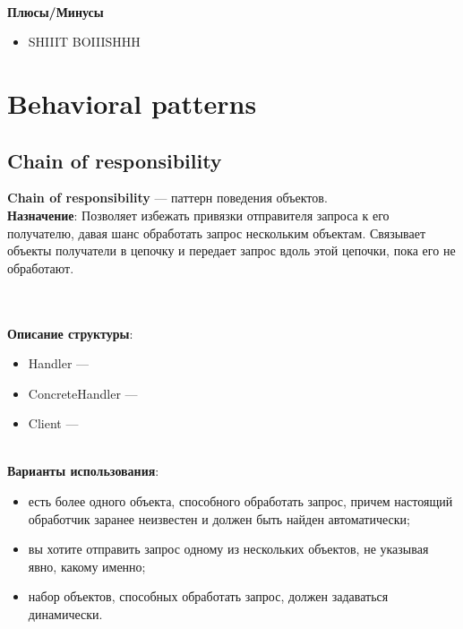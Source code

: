 \documentclass[a3paper,11pt]{report}
\def \boxSize {7cm}
\newcommand{\umlnoteND}[6]{
	\node[umlcd style, anchor=north, draw, shape=umlcdnote, text width=#2] at (#1) (note) {#3};
	\draw [umlcd style dashed line , ] (note.#4) ++(#5) --++(#6) coordinate(tmp) node[circle,inner sep=0pt,draw, fill=black!1, minimum size=5pt] (NoD) { };
}
\newcommand\tab[1][1cm]{\hspace*{#1}}
\begin{document}
\textbf{\\Плюсы/Минусы}
\begin{itemize}
\item [] SHIIIT BOIIISHHH
\end{itemize}
\newpage
\section{Behavioral patterns}
\subsection{Chain of responsibility}

\large\textbf{Chain of responsibility} --- паттерн поведения объектов.
\\
\large\textbf{Назначение}: Позволяет избежать привязки отправителя запроса к его получателю, давая шанс обработать запрос нескольким объектам. Связывает объекты получатели в цепочку и передает запрос вдоль этой цепочки, пока его не обработают.
\\

\\\\
\textbf{Описание структуры}:
\begin{itemize}
\item Handler ---
\item ConcreteHandler ---
\item Client ---
\end{itemize}

\large\textbf{\\Варианты использования}:
\begin{itemize}
\item есть более одного объекта, способного обработать запрос, причем настоящий обработчик заранее неизвестен и должен быть найден автоматически;
\item вы хотите отправить запрос одному из нескольких объектов, не указывая явно, какому именно;
\item набор объектов, способных обработать запрос, должен задаваться динамически.
\end{itemize}
\end{document}
